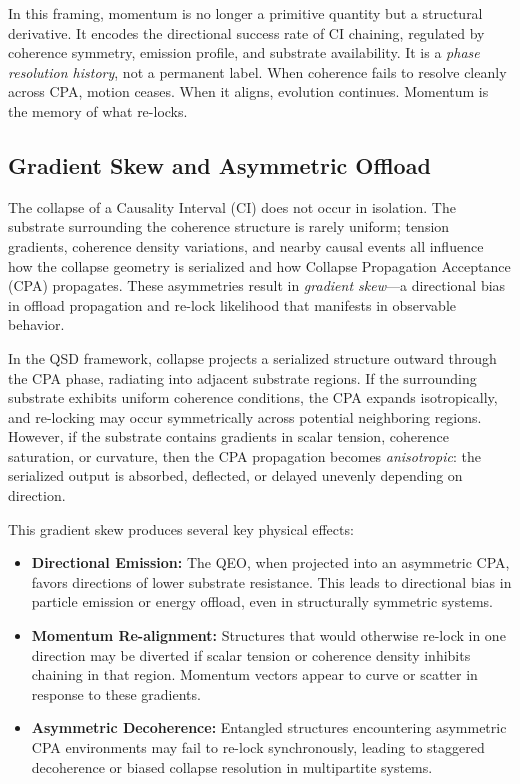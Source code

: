 \documentclass[preprints,article,submit,pdftex,moreauthors]{Definitions/mdpi}
\begin{document}
In this framing, momentum is no longer a primitive quantity but a structural derivative. It encodes the directional success rate of CI chaining, regulated by coherence symmetry, emission profile, and substrate availability. It is a \emph{phase resolution history}, not a permanent label. When coherence fails to resolve cleanly across CPA, motion ceases. When it aligns, evolution continues. Momentum is the memory of what re-locks.

\subsection{Gradient Skew and Asymmetric Offload}

The collapse of a Causality Interval (CI) does not occur in isolation. The substrate surrounding the coherence structure is rarely uniform; tension gradients, coherence density variations, and nearby causal events all influence how the collapse geometry is serialized and how Collapse Propagation Acceptance (CPA) propagates. These asymmetries result in \emph{gradient skew}—a directional bias in offload propagation and re-lock likelihood that manifests in observable behavior.

In the QSD framework, collapse projects a serialized structure outward through the CPA phase, radiating into adjacent substrate regions. If the surrounding substrate exhibits uniform coherence conditions, the CPA expands isotropically, and re-locking may occur symmetrically across potential neighboring regions. However, if the substrate contains gradients in scalar tension, coherence saturation, or curvature, then the CPA propagation becomes \emph{anisotropic}: the serialized output is absorbed, deflected, or delayed unevenly depending on direction.

This gradient skew produces several key physical effects:
\begin{itemize}
    \item \textbf{Directional Emission:} The QEO, when projected into an asymmetric CPA, favors directions of lower substrate resistance. This leads to directional bias in particle emission or energy offload, even in structurally symmetric systems.
    \item \textbf{Momentum Re-alignment:} Structures that would otherwise re-lock in one direction may be diverted if scalar tension or coherence density inhibits chaining in that region. Momentum vectors appear to curve or scatter in response to these gradients.
    \item \textbf{Asymmetric Decoherence:} Entangled structures encountering asymmetric CPA environments may fail to re-lock synchronously, leading to staggered decoherence or biased collapse resolution in multipartite systems.
\end{itemize}
\end{document}
